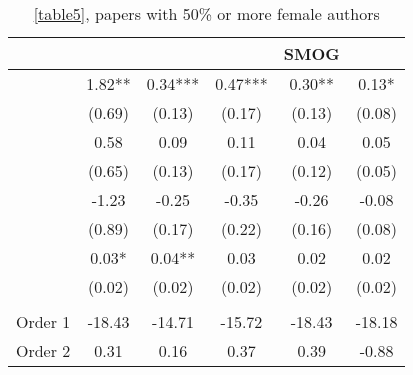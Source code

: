 \begin{table}
    \footnotesize
    \centering
    \begin{threeparttable}
        \caption{\autoref{table5}, papers with 50\% or more female authors}
        \label{tableC5b}
        \begin{tabular}{p{4cm}S@{}S@{}S@{}S@{}S@{}}
            \toprule
            &{}&{}&{}&{SMOG}&{}\\
            \midrule
            &        1.82** &        0.34***&        0.47***&        0.30** &        0.13*  \\
                                          &      (0.69)   &      (0.13)   &      (0.17)   &      (0.13)   &      (0.08)   \\
            &        0.58   &        0.09   &        0.11   &        0.04   &        0.05   \\
                                          &      (0.65)   &      (0.13)   &      (0.17)   &      (0.12)   &      (0.05)   \\
            &       -1.23   &       -0.25   &       -0.35   &       -0.26   &       -0.08   \\
                                          &      (0.89)   &      (0.17)   &      (0.22)   &      (0.16)   &      (0.08)   \\
                  &        0.03*  &        0.04** &        0.03   &        0.02   &        0.02   \\
                                          &      (0.02)   &      (0.02)   &      (0.02)   &      (0.02)   &      (0.02)   \\
             \\
            Order 1&      -18.43   &      -14.71   &      -15.72   &      -18.43   &      -18.18   \\
            Order 2                       &        0.31   &        0.16   &        0.37   &        0.39   &       -0.88   \\
            \midrule

\end{tabular}
\end{threeparttable}
\end{table}
